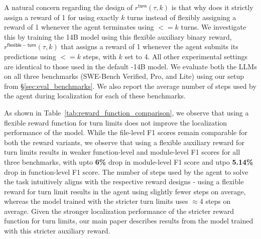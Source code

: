 A natural concern regarding the design of $r^{\mathsf{turn}}(\tau, k)$ is that why does it strictly assign a reward of 1 for using exactly $k$ turns instead of flexibly assigning a reward of 1 whenever the agent terminates using $<=k$ turns. We investigate this by training the 14B model using this flexible auxiliary binary reward,  $r^{\mathsf{flexible-turn}}(\tau, k)$ that assigns a reward of 1 whenever the agent submits its predictions using $<=k$ steps, with $k$ set to 4. All other experimental settings are identical to those used in the default \methodname-14B model. We evaluate both the LLMs on all three benchmarks (SWE-Bench Verified, Pro, and Lite) using our setup from \S\ref{sec:eval_benchmarks}. We also report the average number of steps used by the agent during localization for each of these benchmarks.

As shown in Table~\ref{tab:reward_function_comparison}, we observe that using a flexible reward function for turn limits does not improve the localization performance of the model. While the file-level F1 scores remain comparable for both the reward variants, we observe that using a flexible auxiliary reward for turn limits results in weaker function-level and module-level F1 scores for all three benchmarks, with upto \textbf{6\%} drop in module-level F1 score and utpo \textbf{5.14\%} drop in function-level F1 score. The number of steps used by the agent to solve the task intuitively aligns with the respective reward designs - using a flexible reward for turn limit results in the agent using slightly fewer steps on average, whereas the model trained with the stricter turn limits uses $\approx$4 steps on average. Given the stronger localization performance of the stricter reward function for turn limits, our main paper describes results from the model trained with this stricter auxiliary reward.



% 


